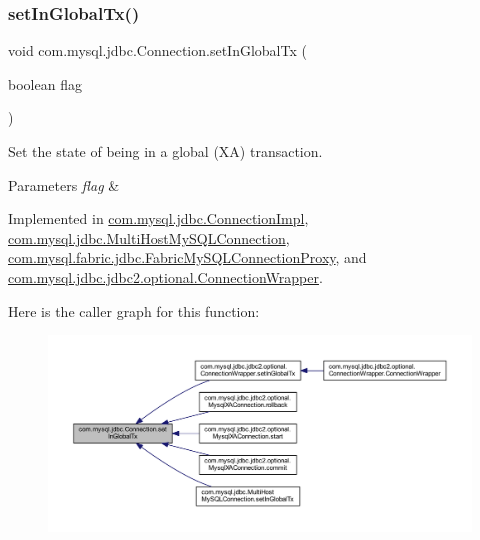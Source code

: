 \subsubsection{\texorpdfstring{set\+In\+Global\+Tx()}{setInGlobalTx()}}
{\footnotesize\ttfamily void com.\+mysql.\+jdbc.\+Connection.\+set\+In\+Global\+Tx (\begin{DoxyParamCaption}\item[{boolean}]{flag }\end{DoxyParamCaption})}

Set the state of being in a global (XA) transaction.


\begin{DoxyParams}{Parameters}
{\em flag} & \\
\hline
\end{DoxyParams}


Implemented in \mbox{\hyperlink{classcom_1_1mysql_1_1jdbc_1_1_connection_impl_abbec8e30775ad9e356305f31e2219bec}{com.\+mysql.\+jdbc.\+Connection\+Impl}}, \mbox{\hyperlink{classcom_1_1mysql_1_1jdbc_1_1_multi_host_my_s_q_l_connection_ae2310c7ba07ef821c22538d1a4cc4c84}{com.\+mysql.\+jdbc.\+Multi\+Host\+My\+S\+Q\+L\+Connection}}, \mbox{\hyperlink{classcom_1_1mysql_1_1fabric_1_1jdbc_1_1_fabric_my_s_q_l_connection_proxy_ab784967ebf6d77d7f0c8dbdaac2597d9}{com.\+mysql.\+fabric.\+jdbc.\+Fabric\+My\+S\+Q\+L\+Connection\+Proxy}}, and \mbox{\hyperlink{classcom_1_1mysql_1_1jdbc_1_1jdbc2_1_1optional_1_1_connection_wrapper_ad2b00fa8ecb1c3455f2f2725ca9fc29c}{com.\+mysql.\+jdbc.\+jdbc2.\+optional.\+Connection\+Wrapper}}.

Here is the caller graph for this function\+:\nopagebreak
\begin{figure}[H]
\begin{center}
\leavevmode
\includegraphics[width=350pt]{interfacecom_1_1mysql_1_1jdbc_1_1_connection_ae5192425468c89f3d404ed0dece17cfc_icgraph}
\end{center}
\end{figure}
\mbox{\label{interfacecom_1_1mysql_1_1jdbc_1_1_connection_af8c0ed78ccafd6088266b19481b85ce6}} 
